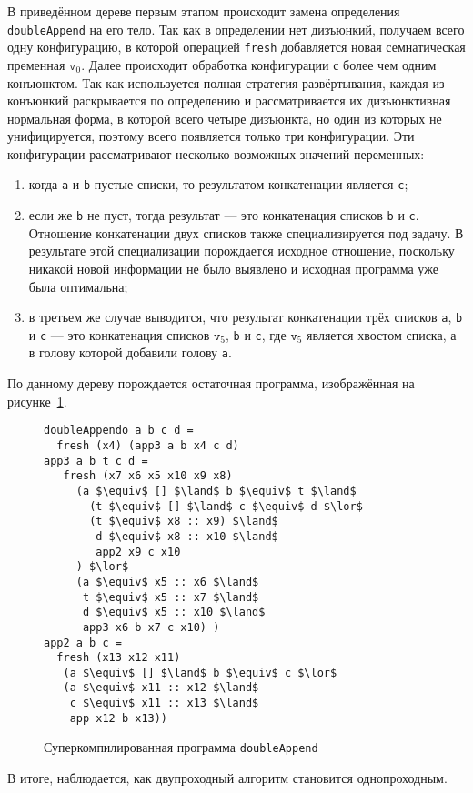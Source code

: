 В приведённом дереве первым этапом происходит замена определения \lstinline{doubleAppend}
на его тело. Так как в определении нет дизъюнкий, получаем всего одну конфигурацию,
в которой операцией \lstinline{fresh} добавляется новая семнатическая пременная $\texttt{v}_0$.
Далее происходит обработка конфигурации с более чем одним конъюнктом. Так как используется
полная стратегия развёртывания, каждая из конъюнкий раскрывается по определению и
рассматривается их дизъюнктивная нормальная форма, в которой всего четыре дизъюнкта,
но один из которых не унифицируется, поэтому всего появляется только три конфигурации.
Эти конфигурации рассматривают несколько возможных значений переменных:
\begin{enumerate}
\item когда \lstinline{a} и \lstinline{b} пустые списки, то результатом конкатенации
является \lstinline{c};
\item если же \lstinline{b} не пуст, тогда результат --- это конкатенация списков \lstinline{b} и \lstinline{c}.
      Отношение конкатенации двух списков также специализируется под задачу.
      В результате этой специализации порождается исходное отношение, поскольку
      никакой новой информации не было выявлено и исходная программа уже была оптимальна;
\item в третьем же случае выводится, что результат конкатенации трёх списков
      \lstinline{a}, \lstinline{b} и \lstinline{c} --- это конкатенация
      списков $\texttt{v}_5$, \lstinline{b} и \lstinline{c}, где $\texttt{v}_5$
      является хвостом списка, а в голову которой добавили голову \lstinline{a}.
\end{enumerate}

По данному дереву порождается остаточная программа, изображённая на рисунке~\ref{fig:dappCodeOpt}.
\begin{figure}[h!]
\begin{lstlisting}
doubleAppendo a b c d =
  fresh (x4) (app3 a b x4 c d)
app3 a b t c d =
   fresh (x7 x6 x5 x10 x9 x8)
     (a $\equiv$ [] $\land$ b $\equiv$ t $\land$
       (t $\equiv$ [] $\land$ c $\equiv$ d $\lor$
       (t $\equiv$ x8 :: x9) $\land$
        d $\equiv$ x8 :: x10 $\land$
        app2 x9 c x10
     ) $\lor$
     (a $\equiv$ x5 :: x6 $\land$
      t $\equiv$ x5 :: x7 $\land$
      d $\equiv$ x5 :: x10 $\land$
      app3 x6 b x7 c x10) ) 
app2 a b c =
  fresh (x13 x12 x11)
   (a $\equiv$ [] $\land$ b $\equiv$ c $\lor$
   (a $\equiv$ x11 :: x12 $\land$
    c $\equiv$ x11 :: x13 $\land$
    app x12 b x13))
\end{lstlisting}
\caption{Суперкомпилированная программа \lstinline{doubleAppend}}
\label{fig:dappCodeOpt}
\end{figure}

В итоге, наблюдается, как двупроходный алгоритм становится однопроходным.
